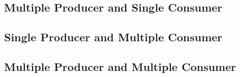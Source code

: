 \subsection{Multiple Producer and Single Consumer}\label{subsec:multiple-producer-and-single-consumer}

\subsection{Single Producer and Multiple Consumer}\label{subsec:single-producer-and-multiple-consumer}

\subsection{Multiple Producer and Multiple Consumer}\label{subsec:multiple-producer-and-multiple-consumer}